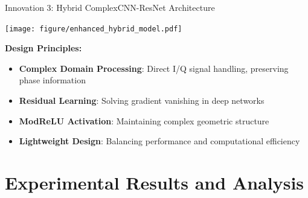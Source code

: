 \documentclass[aspectratio=169]{beamer}
\begin{document}
\begin{frame}{Innovation 3: Hybrid ComplexCNN-ResNet Architecture}
\begin{center}
\texttt{[image: figure/enhanced\_hybrid\_model.pdf]}
\end{center}

\textbf{Design Principles:}
\begin{itemize}
\item \textbf{Complex Domain Processing}: Direct I/Q signal handling, preserving phase information
\item \textbf{Residual Learning}: Solving gradient vanishing in deep networks
\item \textbf{ModReLU Activation}: Maintaining complex geometric structure
\item \textbf{Lightweight Design}: Balancing performance and computational efficiency
\end{itemize}
\end{frame}

\section{Experimental Results and Analysis}
\end{document}
